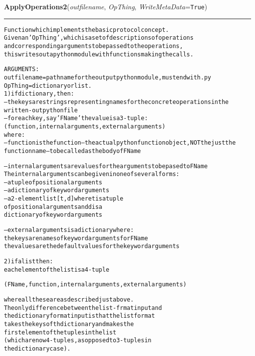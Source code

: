     \vspace{0.5ex}

\hspace{.8\funcindent}\begin{boxedminipage}{\funcwidth}

    \raggedright \textbf{ApplyOperations2}(\textit{outfilename}, \textit{OpThing}, \textit{WriteMetaData}={\tt True})

    \vspace{-1.5ex}

    \rule{\textwidth}{0.5\fboxrule}
\setlength{\parskip}{2ex}
\begin{alltt}

Function which implements the basic protocol concept.  
Given an 'OpThing', which is a set of descriptions of operations 
and corresponding arguments to be passed to the operations, 
this writes out a python module with functions making the calls.

ARGUMENTS:
outfilename = pathname for the output python module, must end with .py
OpThing = dictionary or list.  
1) if dictionary, then:
-- the keys are strings representing names for the concrete operations in the
        written-out python file 
-- for each key, say 'FName' the value is a 3-tuple: (function, internal arguments,  external arguments)
        where:
--function is the function -- the actual python function object, NOT the just the
        function name -- to be called as the body of FName
                                
--internal arguments are values for the arguments to be pased to FName
The internal arguments can be given in one of several forms:
        --a tuple of positional arguments
        --a dictionary of keyword arguments
        --a 2-element list [t,d] where t is a tuple 
        of positional arguments and d is a
        dictionary of keyword arguments

--external arguments is a dictionary where:
        the keys are names of keyword arguments for FName
        the values are the default values for the keyword arguments
                                        
2) if a list then:
        each element of the list is a 4-tuple
        
        (FName, function, internal arguments, external arguments)
        
        where all these are as described just above.  
        The only difference between the list-frmat input and 
        the dictionary format input is that the list format
        takes the keys of th dictionary and makes the
        first element of the tuples in the list 
        (which are now 4-tuples, as opposed to 3-tuples in 
        the dictionary case). 
        

\end{alltt}
\end{boxedminipage}
